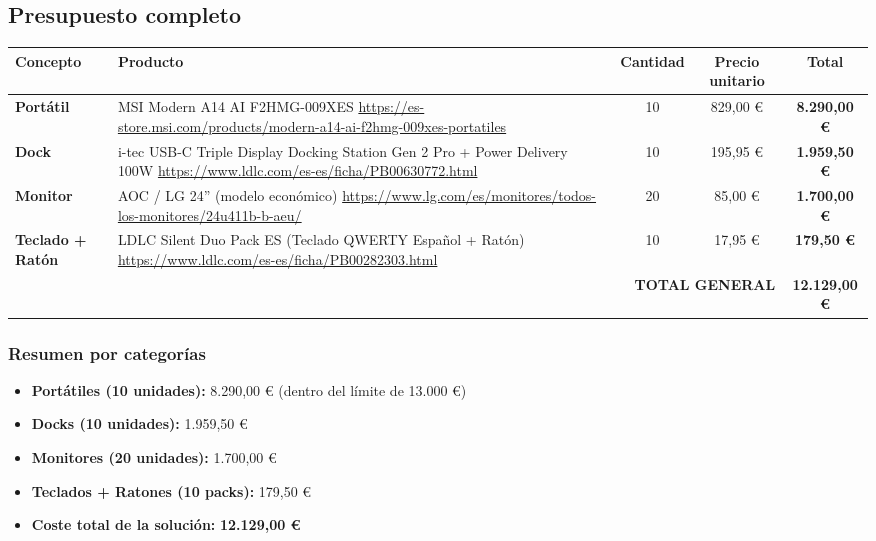 \documentclass[11.5pt]{article}
\begin{document}
	\subsection{Presupuesto completo}
	
	\begin{table}[H]
		\centering
		\footnotesize
		\renewcommand{\arraystretch}{1.3}
		\begin{tabularx}{\textwidth}{|l|X|c|c|c|}
			\hline
			\textbf{Concepto} & \textbf{Producto} & \textbf{Cantidad} & \textbf{Precio unitario} & \textbf{Total} \\
			\hline
			\textbf{Portátil} & 
			MSI Modern A14 AI F2HMG-009XES 
			\newline \url{https://es-store.msi.com/products/modern-a14-ai-f2hmg-009xes-portatiles} & 
			10 & 829,00 € & \textbf{8.290,00 €} \\
			\hline
			\textbf{Dock} & 
			i-tec USB-C Triple Display Docking Station Gen 2 Pro + Power Delivery 100W 
			\newline \url{https://www.ldlc.com/es-es/ficha/PB00630772.html} & 
			10 & 195,95 € & \textbf{1.959,50 €} \\
			\hline
			\textbf{Monitor} & 
			AOC / LG 24'' (modelo económico) 
			\newline \url{https://www.lg.com/es/monitores/todos-los-monitores/24u411b-b-aeu/} & 
			20 & 85,00 € & \textbf{1.700,00 €} \\
			\hline
			\textbf{Teclado + Ratón} & 
			LDLC Silent Duo Pack ES (Teclado QWERTY Español + Ratón) 
			\newline \url{https://www.ldlc.com/es-es/ficha/PB00282303.html} & 
			10 & 17,95 € & \textbf{179,50 €} \\
			\hline
			\multicolumn{4}{|r|}{\textbf{TOTAL GENERAL}} & \textbf{12.129,00 €} \\
			\hline
		\end{tabularx}
	\end{table}
	
	\subsubsection*{Resumen por categorías}
	
	\begin{itemize}
		\item \textbf{Portátiles (10 unidades):} 8.290,00 € \quad (dentro del límite de 13.000 €)
		\item \textbf{Docks (10 unidades):} 1.959,50 €
		\item \textbf{Monitores (20 unidades):} 1.700,00 €
		\item \textbf{Teclados + Ratones (10 packs):} 179,50 €
		\item \textbf{Coste total de la solución:} \textbf{12.129,00 €}
	\end{itemize}
	
\end{document}
